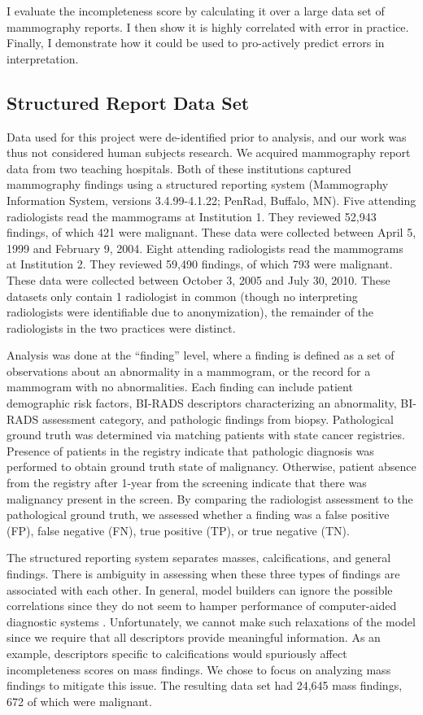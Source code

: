 I evaluate the incompleteness score by calculating it over a large data set of mammography reports. I then show it is highly correlated with error in practice. Finally, I demonstrate how it could be used to pro-actively predict errors in interpretation.

\subsection{Structured Report Data Set}
Data used for this project were de-identified prior to analysis, and our work was thus not considered human subjects research. We acquired mammography report data from two teaching hospitals. Both of these institutions captured mammography findings using a structured reporting system (Mammography Information System, versions 3.4.99-4.1.22; PenRad, Buffalo, MN). Five attending radiologists read the mammograms at Institution 1. They reviewed 52,943 findings, of which 421 were malignant. These data were collected between April 5, 1999 and February 9, 2004. Eight attending radiologists read the mammograms at Institution 2. They reviewed 59,490 findings, of which 793 were malignant. These data were collected between October 3, 2005 and July 30, 2010. These datasets only contain 1 radiologist in common (though no interpreting radiologists were identifiable due to anonymization), the remainder of the radiologists in the two practices were distinct.

Analysis was done at the ``finding'' level, where a finding is defined as a set of observations about an abnormality in a mammogram, or the record for a mammogram with no abnormalities. Each finding can include patient demographic risk factors, BI-RADS descriptors characterizing an abnormality, BI-RADS assessment category, and pathologic findings from biopsy. Pathological ground truth was determined via matching patients with state cancer registries. Presence of patients in the registry indicate that pathologic diagnosis was performed to obtain ground truth state of malignancy. Otherwise, patient absence from the registry after 1-year from the screening indicate that there was malignancy present in the screen. By comparing the radiologist assessment to the pathological ground truth, we assessed whether a finding was a false positive (FP), false negative (FN), true positive (TP), or true negative (TN).

The structured reporting system separates masses, calcifications, and general findings. There is ambiguity in assessing when these three types of findings are associated with each other. In general, model builders can ignore the possible correlations since they do not seem to hamper performance of computer-aided diagnostic systems \cite{Burnside:2000wl, ElizabethS:2005gc, Burnside:2009br}. Unfortunately, we cannot make such relaxations of the model since we require that all descriptors provide meaningful information. As an example, descriptors specific to calcifications would spuriously affect incompleteness scores on mass findings. We chose to focus on analyzing mass findings to mitigate this issue. The resulting data set had 24,645 mass findings, 672 of which were malignant.

